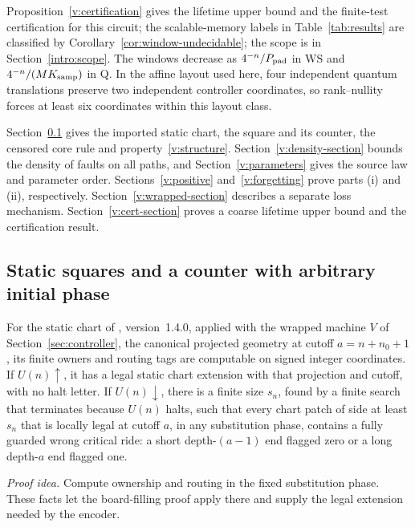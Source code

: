 Proposition~\ref{v:certification} gives the lifetime upper bound and the finite-test certification for this circuit; the scalable-memory labels in Table~\ref{tab:results} are classified by Corollary~\ref{cor:window-undecidable}; the scope is in Section~\ref{intro:scope}. The windows decrease as \(4^{-n}/P_{\rm pad}\) in \(\mathrm{WS}\) and \(4^{-n}/(MK_{\rm samp})\) in Q. In the affine layout used here, four independent quantum translations preserve two independent controller coordinates, so rank--nullity forces at least six coordinates within this layout class.

Section~\ref{v:classical-rule} gives the imported static chart, the square and its counter, the censored core rule and property~\ref{v:structure}. Section~\ref{v:density-section} bounds the density of faults on all paths, and Section~\ref{v:parameters} gives the source law and parameter order. Sections~\ref{v:positive} and~\ref{v:forgetting} prove parts (i) and (ii), respectively. Section~\ref{v:wrapped-section} describes a separate loss mechanism. Section~\ref{v:cert-section} proves a coarse lifetime upper bound and the certification result.

\subsection{Static squares and a counter with arbitrary initial phase}\label{v:classical-rule}
\begin{proposition}\label{v:static-import}
For the static chart of \cite{DMNoise2026}, version~1.4.0, applied with the wrapped machine \(V\) of Section~\ref{sec:controller}, the canonical projected geometry at cutoff \(a=n+n_0+1\), its finite owners and routing tags are computable on signed integer coordinates. If \(U(n)\uparrow\), it has a legal static chart extension with that projection and cutoff, with no halt letter. If \(U(n)\downarrow\), there is a finite size \(s_n\), found by a finite search that terminates because \(U(n)\) halts, such that every chart patch of side at least \(s_n\) that is locally legal at cutoff \(a\), in any substitution phase, contains a fully guarded wrong critical ride: a short depth-\((a-1)\) end flagged zero or a long depth-\(a\) end flagged one.
\end{proposition}
\par\noindent\emph{Proof idea.} Compute ownership and routing in the fixed substitution phase. These facts let the board-filling proof apply there and supply the legal extension needed by the encoder.

